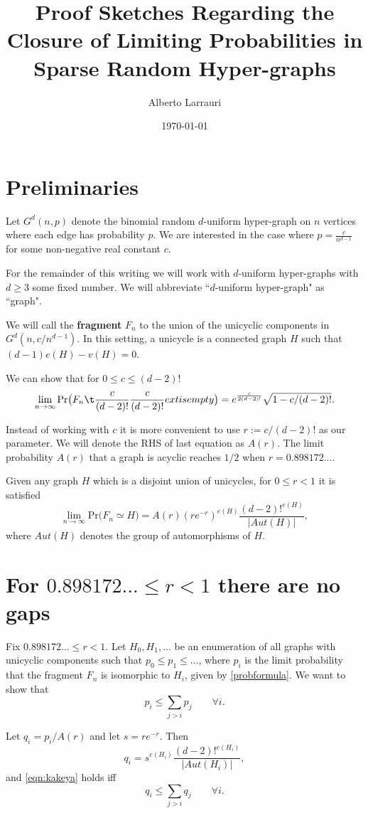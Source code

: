 \documentclass[11pt,notitlepage,a4paper]{article}
\title{Proof Sketches Regarding the Closure of 
	Limiting Probabilities in Sparse Random Hyper-graphs}
\date{\today}
\author{Alberto Larrauri}
\theoremstyle{definition}
\newcommand{\Ln}{\lim\limits_{n\to \infty}}
\begin{document}
	\maketitle
	
\section*{Preliminaries}

Let $G^d(n,p)$ denote the binomial random $d$-uniform hyper-graph on $n$ 
vertices where each edge has probability $p$. We are interested in 
the case where $p=\frac{c}{n^{d-1}}$ for some non-negative real constant $c$.
\par
For the remainder of this writing we will work with $d$-uniform hyper-graphs
with $d\geq 3$ some fixed number. We will abbreviate ``$d$-uniform hyper-graph"
as ``graph".
\par

We will call the \textbf{fragment} $F_n$ to the union of the unicyclic 
components in $G^d(n,c/n^{d-1})$. In this setting, a unicycle is a connected
graph $H$ such that $(d-1)e(H)-v(H)=0$. 
\par


We can show that for $0\leq c \leq (d-2)!$
\[ \Ln \mathrm{Pr}\big( F_n \t\frac{c}{(d-2)!}\frac{c}{(d-2)!}ext{ is empty }\big)=
 e^{\frac{c}{2(d-2)!}}\sqrt{1 - c/(d-2)!}.\]

Instead of working with $c$ it is more convenient to use $r:= c/(d-2)!$
as our parameter. We will denote the RHS of last equation as $A(r)$. 
The limit probability $A(r)$ that a graph is acyclic reaches $1/2$ when
$r=0.898172...$.\par

Given any graph $H$ which is a disjoint union of unicycles, 
for $0\leq r < 1$ it is satisfied
\begin{equation} \label{probformula}
\Ln \mathrm{Pr}\big( F_n\simeq H \big)= A(r)(re^{-r})^{e(H)}
\frac{(d-2)!^{e(H)}}{|Aut(H)|},
\end{equation}
where $Aut(H)$ denotes the group of automorphisms of $H$.  \par 

\section*{For $0.898172...\leq r < 1$ there are no gaps}

Fix $0.898172...\leq r < 1$.
Let $H_0,H_1,\dots$ be an enumeration of all graphs with 
unicyclic components such that $p_0 \leq p_1 \leq \dots$,
where $p_i$ is the limit probability that the fragment 
$F_n$ is isomorphic to $H_i$, given by \cref{probformula}.
We want to show that
\begin{equation} \label{eqn:kakeya}
	p_i \leq \sum_{j>i} p_j \qquad \forall i.
\end{equation} 
\par
Let $q_i=p_i/A(r)$ and let $s=re^{-r}$. Then
 \[ q_i= s^{e(H_i)}
 \frac{(d-2)!^{e(H_i)}}{|Aut(H_i)|},
 \]
and \cref{eqn:kakeya} holds iff
\begin{equation} \label{eqn:kakeya2}
q_i \leq \sum_{j>i} q_j \qquad \forall i. 
\end{equation}
\end{document}
